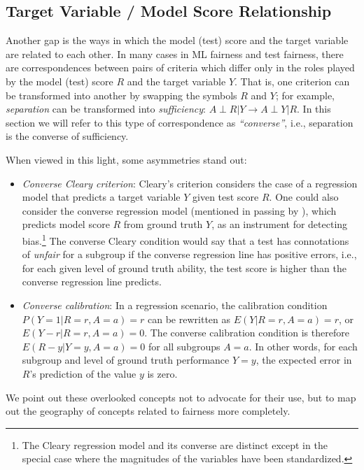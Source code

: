 \documentclass[sigconf,letterpaper,9pt]{acmart}
\begin{document}
\subsection{Target Variable / Model Score Relationship} 

Another gap is the ways in which
the model (test) score and the target variable are related to each other. In many cases in ML fairness  and test fairness,
there are correspondences between pairs of criteria which differ
only in the roles played by the model (test) score $R$ and the target variable $Y$.
That is, one criterion can be transformed into another by swapping
the symbols $R$ and $Y$; for example, {\em separation} can be transformed into {\em sufficiency}: $A\perp R|Y \longrightarrow A\perp Y |R$. In this section we will refer to this type of correspondence as {\em ``converse''}, i.e.,
separation is the converse of sufficiency.

When viewed in this light, some asymmetries stand out:

\begin{itemize}
\item {\em Converse Cleary criterion}: Cleary's criterion considers the case
of a regression model that predicts a target variable $Y$ given test score $R$.
One could also consider the converse regression model (mentioned in passing by \cite{thorndike1971concepts}), which predicts model score
$R$ from ground truth $Y$, as an instrument for detecting bias.\footnote{The Cleary regression model and its converse are distinct except in the special
case where the magnitudes of the variables have been standardized.} The converse
Cleary condition would say that a test has connotations of {\em unfair}
for a subgroup if the converse
regression line has positive errors, i.e., for each given level of ground truth
ability, the test score is higher than the converse regression line predicts.
\item {\em Converse calibration}: In a regression scenario, the calibration condition
$P(Y=1|R=r, A=a)=r$ can be rewritten as $E(Y|R=r, A=a)=r$, or
$E(Y-r|R=r, A=a)=0$. The converse calibration 
condition is therefore $E(R-y|Y=y, A=a)=0$ for all subgroups $A=a$. In other words,
for each subgroup and level of ground truth performance $Y=y$, the expected
error in $R$'s prediction of the value $y$ is zero.
\end{itemize}
%
We point out these overlooked concepts not to advocate for their use, but to 
map out the geography of concepts related to fairness more completely.
\end{document}
